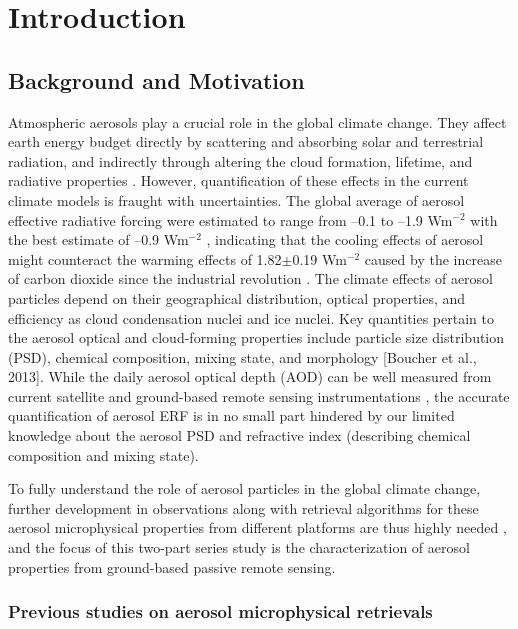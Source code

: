 \chapter{Introduction}

\section{Background and Motivation}

Atmospheric aerosols play a crucial role in the global climate change. They
affect earth energy budget directly by scattering and absorbing solar and
terrestrial radiation, and indirectly through altering the cloud formation,
lifetime, and radiative properties \citep{haywood00,ramanathan01}.
However, quantification of these effects in the current climate
models is fraught with uncertainties. The global average of aerosol effective
radiative forcing were estimated to range from --0.1 to --1.9 Wm$^{-2}$ with the 
best estimate of --0.9 Wm$^{-2}$ \citep{boucher13}, indicating that the cooling
effects of aerosol might counteract the warming effects of 1.82$\pm$0.19 Wm$^{-2}$
caused by the increase of carbon dioxide since the industrial revolution 
\citep{myhre13}. The climate effects of aerosol particles depend on their
geographical distribution, optical properties, and efficiency as cloud
condensation nuclei and ice nuclei. 
Key quantities pertain to the aerosol optical and
cloud-forming properties include particle size distribution (PSD), chemical
composition, mixing state, and morphology [Boucher et al., 2013]. While the
daily aerosol optical depth (AOD) can be well measured from current satellite
and ground-based remote sensing instrumentations \citep[e.g.,][]{holben98,kaufman02},
the accurate quantification of aerosol ERF is in no
small part hindered by our limited knowledge about the aerosol PSD and
refractive index (describing chemical composition and mixing state). 

To fully understand the role of aerosol particles in the global climate change, 
further development in observations along with retrieval algorithms for these
aerosol microphysical properties from different platforms are thus highly
needed \citep{Mishchenko04}, and the focus of this two-part series study
is the characterization of aerosol properties from ground-based passive remote
sensing.

\subsection{Previous studies on aerosol microphysical retrievals}

